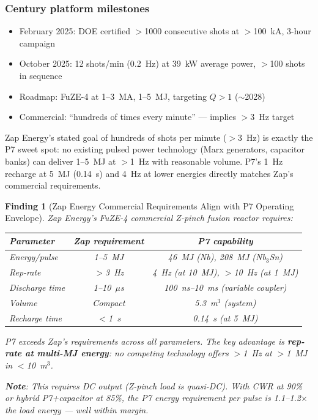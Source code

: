 \documentclass[11pt]{article}
\newtheorem{finding}{Finding}
\begin{document}
\subsubsection{Century platform milestones}

\begin{itemize}[nosep]
  \item February 2025: DOE certified $>$1000 consecutive shots at
    $>$100~kA, 3-hour campaign
  \item October 2025: 12 shots/min (0.2~Hz) at 39~kW average power,
    $>$100 shots in sequence
  \item Roadmap: FuZE-4 at 1--3~MA, 1--5~MJ, targeting $Q > 1$
    ($\sim$2028)
  \item Commercial: ``hundreds of times every minute'' --- implies
    $>$3~Hz target
\end{itemize}

Zap Energy's stated goal of hundreds of shots per minute ($>$3~Hz)
is exactly the P7 sweet spot: no existing pulsed power technology
(Marx generators, capacitor banks) can deliver 1--5~MJ at $>$1~Hz
with reasonable volume. P7's 1~Hz recharge at 5~MJ (0.14~s) and
4~Hz at lower energies directly matches Zap's commercial requirements.

\begin{finding}[Zap Energy Commercial Requirements Align with P7 Operating Envelope]
\label{find:zap-alignment}
Zap Energy's FuZE-4 commercial Z-pinch fusion reactor requires:
\begin{center}
\begin{tabular}{lcc}
\toprule
Parameter & Zap requirement & P7 capability \\
\midrule
Energy/pulse & 1--5~MJ & 46~MJ (Nb), 208~MJ (Nb$_3$Sn) \\
Rep-rate & $>$3~Hz & 4~Hz (at 10~MJ), $>$10~Hz (at 1~MJ) \\
Discharge time & 1--10~$\mu$s & 100~ns--10~ms (variable coupler) \\
Volume & Compact & 5.3~m$^3$ (system) \\
Recharge time & $<$1~s & 0.14~s (at 5~MJ) \\
\bottomrule
\end{tabular}
\end{center}

P7 exceeds Zap's requirements across all parameters. The key advantage
is \textbf{rep-rate at multi-MJ energy}: no competing technology offers
$>$1~Hz at $>$1~MJ in $<$10~m$^3$.

\textbf{Note}: This requires DC output (Z-pinch load is quasi-DC).
With CWR at 90\% or hybrid P7+capacitor at 85\%, the P7 energy
requirement per pulse is 1.1--1.2$\times$ the load energy ---
well within margin.
\end{finding}
\end{document}
